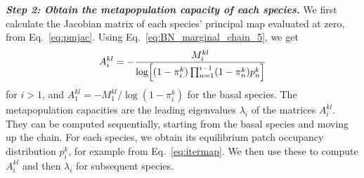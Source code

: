 \documentclass[11pt]{article}
\let\originalleft\left
\let\originalright\right
\renewcommand{\left}{\mathopen{}\mathclose\bgroup\originalleft}
\renewcommand{\right}{\aftergroup\egroup\originalright}
\begin{document}
\textit{\textbf{Step 2: Obtain the metapopulation capacity of each species.}}
We first calculate the Jacobian matrix of each species' principal map evaluated at zero, from Eq.~\ref{eq:pmjac}. Using Eq.~\ref{eq:BN_marginal_chain_5}, we get
\begin{equation}
  \label{eq:BN_A_chain}
  A_i^{kl} = -\frac{M_i^{kl}}{\log\left[ (1 - \pi_i^k) \prod_{n=1}^{i-1}
      (1 - \pi_n^k) p_n^k \right]}
\end{equation}
for $i>1$, and $A_1^{kl} = -M_1^{kl} / \log(1 - \pi_i^k)$ for the basal species. The metapopulation capacities are the leading eigenvalues $\lambda_i$ of the matrices $A_i^{kl}$. They can be computed sequentially, starting from the basal species and moving up the chain. For each species, we obtain its equilibrium patch occupancy distribution $p_i^k$, for example from Eq.~\ref{eq:itermap}. We then use these to compute $A_i^{kl}$ and then $\lambda_i$ for subsequent species.
\end{document}
